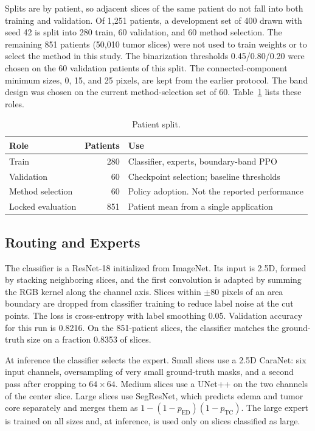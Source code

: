 \documentclass[runningheads]{llncs}
\begin{document}
Splits are by patient, so adjacent slices of the same patient do not fall into both training and validation. Of 1{,}251 patients, a development set of 400 drawn with seed 42 is split into 280 train, 60 validation, and 60 method selection. The remaining 851 patients (50{,}010 tumor slices) were not used to train weights or to select the method in this study. The binarization thresholds 0.45/0.80/0.20 were chosen on the 60 validation patients of this split. The connected-component minimum sizes, 0, 15, and 25 pixels, are kept from the earlier protocol. The band design was chosen on the current method-selection set of 60. Table~\ref{tab:split} lists these roles.

\begin{table}[!ht]
\caption{Patient split.}
\label{tab:split}
\centering
\begin{tabular}{|l|r|l|}
\hline
Role & Patients & Use \\
\hline
Train & 280 & Classifier, experts, boundary-band PPO \\
\hline
Validation & 60 & Checkpoint selection; baseline thresholds \\
\hline
Method selection & 60 & Policy adoption. Not the reported performance \\
\hline
Locked evaluation & 851 & Patient mean from a single application \\
\hline
\end{tabular}
\end{table}

\subsection{Routing and Experts}
The classifier is a ResNet-18 initialized from ImageNet. Its input is 2.5D, formed by stacking neighboring slices, and the first convolution is adapted by summing the RGB kernel along the channel axis. Slices within $\pm80$ pixels of an area boundary are dropped from classifier training to reduce label noise at the cut points. The loss is cross-entropy with label smoothing 0.05. Validation accuracy for this run is 0.8216. On the 851-patient slices, the classifier matches the ground-truth size on a fraction 0.8353 of slices.

At inference the classifier selects the expert. Small slices use a 2.5D CaraNet: six input channels, oversampling of very small ground-truth masks, and a second pass after cropping to $64\times64$. Medium slices use a UNet++ on the two channels of the center slice. Large slices use SegResNet, which predicts edema and tumor core separately and merges them as $1-(1-p_{\mathrm{ED}})(1-p_{\mathrm{TC}})$. The large expert is trained on all sizes and, at inference, is used only on slices classified as large.
\end{document}
